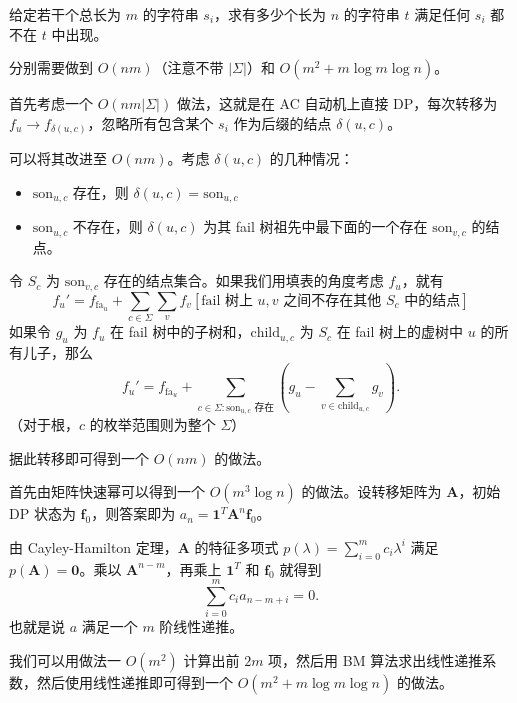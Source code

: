 \begin{exercise}[禁止子串]
    给定若干个总长为 $m$ 的字符串 $s_i$，求有多少个长为 $n$ 的字符串 $t$ 满足任何 $s_i$ 都不在 $t$ 中出现。
    
    分别需要做到 $O(nm)$（注意不带 $|\Sigma|$）和 $O(m^2+m\log m\log n)$。
\end{exercise}
\begin{solution}[做法一]
    首先考虑一个 $O(nm|\Sigma|)$ 做法，这就是在 AC 自动机上直接 DP，每次转移为 $f_u\to f_{\delta(u,c)}$，忽略所有包含某个 $s_i$ 作为后缀的结点 $\delta(u,c)$。
    
    可以将其改进至 $O(nm)$。考虑 $\delta(u,c)$ 的几种情况：
    \begin{itemize}
        \item $\mathrm{son}_{u,c}$ 存在，则 $\delta(u,c)=\mathrm{son}_{u,c}$
        \item $\mathrm{son}_{u,c}$ 不存在，则 $\delta(u,c)$ 为其 fail 树祖先中最下面的一个存在 $\mathrm{son}_{v,c}$ 的结点。
    \end{itemize}

    令 $S_c$ 为 $\mathrm{son}_{v,c}$ 存在的结点集合。如果我们用填表的角度考虑 $f_u$，就有
    $$
    f_u'=f_{\mathrm{fa}_u}+\sum_{c\in \Sigma}\sum_{v} f_v[\text{fail 树上 }u,v\text{ 之间不存在其他 }S_c\text{ 中的结点}]
    $$
    如果令 $g_u$ 为 $f_u$ 在 fail 树中的子树和，$\mathrm{child}_{u,c}$ 为 $S_c$ 在 fail 树上的虚树中 $u$ 的所有儿子，那么
    $$
    f_u'=f_{\mathrm{fa}_u}+\sum_{c\in \Sigma:\mathrm{son}_{u,c}\text{ 存在}}\left(g_u-\sum_{v\in \mathrm{child}_{u,c}}g_v\right).
    $$
    （对于根，$c$ 的枚举范围则为整个 $\Sigma$）
    
    据此转移即可得到一个 $O(nm)$ 的做法。
\end{solution}
\begin{solution}[做法二]
    首先由矩阵快速幂可以得到一个 $O(m^3\log n)$ 的做法。设转移矩阵为 $\mathbf A$，初始 DP 状态为 $\mathbf f_0$，则答案即为 $a_n=\mathbf 1^T\mathbf A^n \mathbf f_0$。

    由 Cayley-Hamilton 定理，$\mathbf A$ 的特征多项式 $p(\lambda)=\sum_{i=0}^m c_i\lambda^i$ 满足 $p(\mathbf A)=\mathbf 0$。乘以 $\mathbf A^{n-m}$，再乘上 $\mathbf 1^T$ 和 $\mathbf f_0$ 就得到
    $$
    \sum_{i=0}^m c_i a_{n-m+i}=0.
    $$    
    也就是说 $a$ 满足一个 $m$ 阶线性递推。

    我们可以用做法一 $O(m^2)$ 计算出前 $2m$ 项，然后用 BM 算法求出线性递推系数，然后使用线性递推即可得到一个 $O(m^2+m\log m\log n)$ 的做法。
\end{solution}
